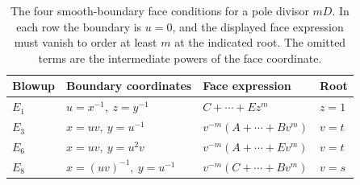 \begin{table}[htbp]
\centering
\caption{The four smooth-boundary face conditions for a pole divisor
\(mD\). In each row the boundary is \(u=0\), and the displayed face
expression must vanish to order at least \(m\) at the indicated root.
The omitted terms are the intermediate powers of the face coordinate.}
\label{tab:faces}
\begin{tabular}{@{}llll@{}}
\toprule
Blowup & Boundary coordinates & Face expression & Root \\
\midrule
\(E_1\) & \(u=x^{-1},\ z=y^{-1}\) & \(C+\cdots+Ez^m\) & \(z=1\) \\
\(E_3\) & \(x=uv,\ y=u^{-1}\) & \(v^{-m}(A+\cdots+Bv^m)\) & \(v=t\) \\
\(E_6\) & \(x=uv,\ y=u^2v\) & \(v^{-m}(A+\cdots+Ev^m)\) & \(v=t\) \\
\(E_8\) & \(x=(uv)^{-1},\ y=u^{-1}\) & \(v^{-m}(C+\cdots+Bv^m)\) & \(v=s\) \\
\bottomrule
\end{tabular}
\end{table}
